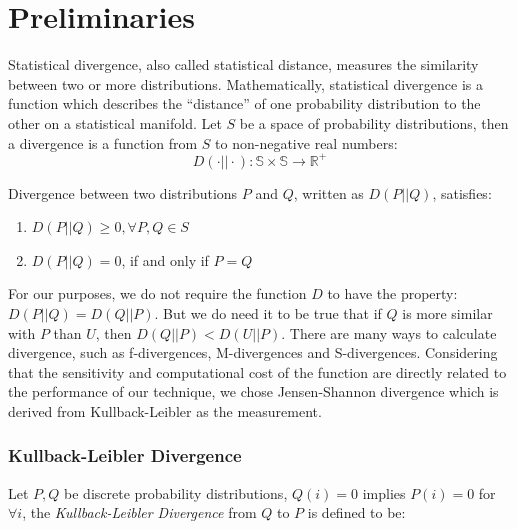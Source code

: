 \documentclass[a4paper]{IEEEtran}
\begin{document}
	\section{Preliminaries}\label{sec:preliminaries}
		Statistical divergence, also called statistical distance, measures the similarity between two or more distributions.
		Mathematically, statistical divergence is a function which describes the ``distance'' of one probability distribution to the other on a statistical manifold. Let $S$ be a space of probability distributions, then a divergence is a function from $S$ to non-negative real numbers: 
		\begin{equation}
			D(\cdot || \cdot): \mathbb{S} \times \mathbb{S} \rightarrow \mathbb{R^+}
		\end{equation}
		
		Divergence between two distributions $P$ and $Q$, written as $D(P||Q)$, satisfies:
		
		\begin{enumerate}
			\item $D(P||Q) \ge 0, \forall P, Q \in S$
			\item $D(P||Q) = 0$, if and only if $P=Q$
		\end{enumerate}
		
		For our purposes, we do not require the function $D$ to have the property: $D(P||Q) = D(Q||P)$. But we do need it to be true that if $Q$ is more similar with $P$ than $U$, then $D(Q||P) < D(U||P)$. There are many ways to calculate divergence, such as f-divergences, M-divergences and S-divergences.
		Considering that the sensitivity and computational cost of the function are directly related to the performance of our technique, we chose Jensen-Shannon divergence which is derived from Kullback-Leibler as the measurement.
		
		\subsubsection{Kullback-Leibler Divergence}
		Let $P,Q$ be discrete probability distributions, $Q(i)=0$ implies $P(i)=0$ for $\forall i$, the \textit{Kullback-Leibler Divergence} from $Q$ to $P$ is defined to be:
		
\end{document}
